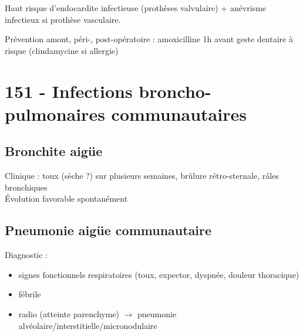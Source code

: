 Haut risque d'endocardite infectieuse (prothèses valvulaire) + anévrisme
infectieux si prothèse vasculaire.

Prévention amont, péri-, post-opératoire : 
amoxicilline 1h avant geste dentaire à risque (clindamycine si allergie)

\section{151 - Infections broncho-pulmonaires communautaires}

\subsection{Bronchite aigüe}

Clinique : toux (sèche ?) sur plusieurs semaines, brûlure
rétro-sternale, râles bronchiques\\
Évolution favorable spontanément

\subsection{Pneumonie aigüe communautaire}

Diagnostic :

\begin{itemize}
\item signes fonctionnels respiratoires (toux, expector, dyspnée, douleur
  thoracique)
\item fébrile
\item radio (atteinte parenchyme) $\to$ pneumonie
  alvéolaire/interstitielle/micronodulaire
\end{itemize}

